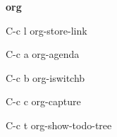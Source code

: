 \documentclass[10pt]{article}
\renewcommand\subsection[1]{\smallskip\par\textbf{\color{heading}#1}}
\begin{document}
\begin{CJK}{UTF8}{gbsn}
\begin{multicols}{3}
  \subsection{org}
  \begin{keylist}
  \item[C-c l] org-store-link
  \item[C-c a] org-agenda
  \item[C-c b] org-iswitchb
  \item[C-c c] org-capture
  \item[C-c t] org-show-todo-tree
  \end{keylist}

\end{multicols}
\end{CJK}
\end{document}

